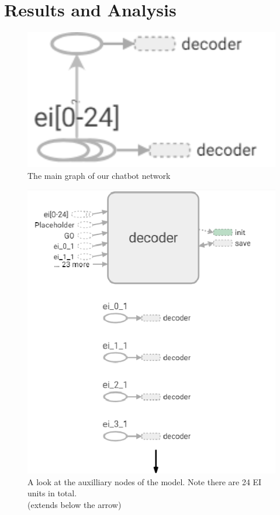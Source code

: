 \documentclass[titlepage]{article}
\begin{document}
\section{Results and Analysis}
\begin{figure}[H]
	\centering
	\includegraphics[width=120mm]{main_graph.png}
	\caption{The main graph of our chatbot network}
	\label{fig:maingraph}
\end{figure}
\begin{figure}[H]
	\centering
	\includegraphics[width=120mm]{aux_nodes.png}
	\caption{A look at the auxilliary nodes of the model. Note there are 24 EI units in total.\\(extends below the arrow)}
	\label{fig:auxnodes}
\end{figure}
\end{document}
